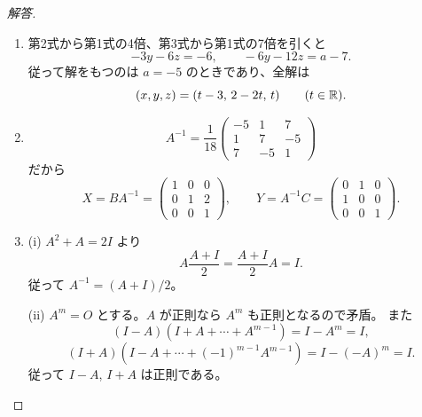 \begin{proof}[解答]
\begin{enumerate}
  \item[(1)] 第2式から第1式の4倍、第3式から第1式の7倍を引くと
  \[
  -3y-6z=-6,\qquad -6y-12z=a-7.
  \]
  従って解をもつのは $a=-5$ のときであり、全解は
  \[
  (x,y,z)=(t-3,\,2-2t,\,t)\qquad(t\in\mathbb{R}).
  \]

  \item[(2)]
  \[
  A^{-1}=\frac1{18}
  \begin{pmatrix}-5&1&7\\1&7&-5\\7&-5&1\end{pmatrix}
  \]
  だから
  \[
  X=BA^{-1}=\begin{pmatrix}1&0&0\\0&1&2\\0&0&1\end{pmatrix},
  \qquad
  Y=A^{-1}C=\begin{pmatrix}0&1&0\\1&0&0\\0&0&1\end{pmatrix}.
  \]

  \item[(3)] (i) $A^2+A=2I$ より
  \[
  A\frac{A+I}{2}=\frac{A+I}{2}A=I.
  \]
  従って $A^{-1}=(A+I)/2$。

  (ii) $A^m=O$ とする。$A$ が正則なら $A^m$ も正則となるので矛盾。
  また
  \[
  (I-A)(I+A+\cdots+A^{m-1})=I-A^m=I,
  \]
  \[
  (I+A)(I-A+\cdots+(-1)^{m-1}A^{m-1})=I-(-A)^m=I.
  \]
  従って $I-A$, $I+A$ は正則である。
\end{enumerate}
\end{proof}

